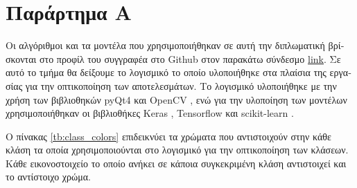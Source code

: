 \chapter*{\textgreek{Παράρτημα Α}}

\pagestyle{fancy}
\fancyhf{}
\fancyhead[C]{}
\renewcommand{\footrulewidth}{1pt}
\cfoot{\thepage}

\textgreek{Οι αλγόριθμοι και τα μοντέλα που χρησιμοποιήθηκαν σε αυτή την διπλωματική βρίσκονται στο προφίλ του συγγραφέα στο }Github \textgreek{στον παρακάτω σύνδεσμο} \href{https://github.com/dimimal/semantics_segmentation_of_urban_environments}{link}. \textgreek{Σε αυτό το τμήμα θα δείξουμε το λογισμικό το οποίο υλοποιήθηκε στα πλαίσια της εργασίας για την οπτικοποίηση των αποτελεσμάτων. Το λογισμικό υλοποιήθηκε με την χρήση των βιβλιοθηκών }pyQt4 \cite{pyqt_doc} \textgreek{και} OpenCV \cite{opencv_lib,opencv_man}, \textgreek{ενώ για την υλοποίηση των μοντέλων χρησιμοποιήθηκαν οι βιβλιοθήκες } Keras \cite{keras_bib}, Tensorflow \cite{tensorflow_bib} \textgreek{και} scikit-learn \cite{sklearn_bib}.
\par

\textgreek{Ο πίνακας }\ref{tb:class_colors} \textgreek{επιδεικνύει τα χρώματα που αντιστοιχούν στην κάθε κλάση τα οποία χρησιμοποιούνται στο λογισμικό για την οπτικοποίηση των κλάσεων. Κάθε εικονοστοιχείο το οποίο ανήκει σε κάποια συγκεκριμένη κλάση αντιστοιχεί και το αντίστοιχο χρώμα. }


